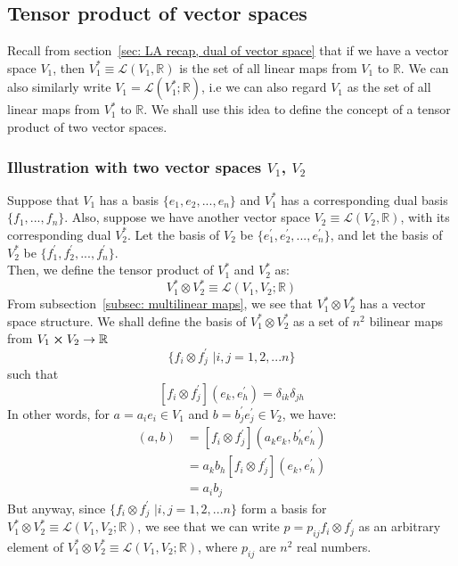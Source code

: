     \subsection{Tensor product of vector spaces}
      Recall from section~\ref{sec: LA recap, dual of vector space} that if
      we have a vector space $V_1$, then $V^*_1 \equiv \mathcal{L}(V_1,
      \mathbb{R})$ is the set of all linear maps from $V_1$ to $\mathbb{R}$.
      We can also similarly write $V_1 = \mathcal{L}(V_1^*;\mathbb{R})$, i.e
      we can also regard $V_1$ as the set of all linear maps from $V_1^*$ to
      $\mathbb{R}$. We shall use this idea to define the concept of a tensor
      product of two vector spaces.

      \subsubsection{Illustration with two vector spaces $V_1$, $V_2$}
      Suppose that $V_1$ has a basis $\{e_1, e_2,...,e_n\}$ and $V_1^*$ has a
      corresponding dual basis $\{f_1,...,f_n\}$. Also, suppose we have
      another vector space $V_2 \equiv \mathcal{L}(V_2,\mathbb{R})$, with its
      corresponding dual $V_2^*$. Let the basis of $V_2$ be $\{e_1^\prime,
      e_2^\prime,...,e_n^\prime\}$, and let the basis of $V_2^*$ be
      $\{f_1^\prime, f_2^\prime,...,f_n^\prime\}$.\\
      Then, we define the tensor product of
      $V_1^*$ and $V_2^*$ as:
        \begin{equation}
          V_1^* \otimes V_2^* \equiv \mathcal{L}(V_1,V_2;\mathbb{R})
        \end{equation}
      From subsection~\ref{subsec: multilinear maps}, we see that $V_1^*
      \otimes V_2^*$ has a vector space structure. We shall define the basis
      of $V_1^* \otimes V_2^*$ as a set of $n^2$ bilinear maps from $V_1
      \cross V_2 \rightarrow \mathbb{R}$
        \[ \{f_i \otimes f_j^\prime \, \, |i,j = 1,2,...n\}\]
      such that 
        \[ [f_i \otimes f_j^\prime] (e_k, e_h^\prime) = \delta_{ik}
        \delta_{jh}\]
      In other words, for $a = a_i e_i \in V_1$ and $b = b_j^\prime
      e^\prime_j \in V_2$, we have:
        \begin{align*}
          [f_i \otimes f_j^\prime](a,b) 
          &= [f_i \otimes f_j^\prime](a_k e_k ,b_h^\prime e^\prime_h) \\
          &= a_k b_h [f_i \otimes f_j^\prime](e_k, e_h^\prime) \\
          &= a_i b_j
        \end{align*}
      But anyway, since $\{f_i \otimes f_j^\prime \, \, |i,j = 1,2,...n\}$
      form a basis for $V_1^* \otimes V_2^* \equiv
      \mathcal{L}(V_1,V_2;\mathbb{R})$, we see that we can write $p = p_{ij}
      f_i \otimes f_j^\prime$ as an arbitrary element of $V_1^* \otimes V_2^*
      \equiv \mathcal{L}(V_1,V_2;\mathbb{R})$, where $p_{ij}$ are $n^2$
      real numbers.

